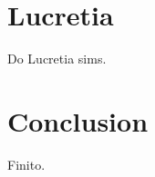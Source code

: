 \documentclass[aps,prl,preprint,groupedaddress]{revtex4-1}
\begin{document}
\section{Lucretia}
Do Lucretia sims.

\section{Conclusion}
Finito.


%



%
\end{document}

